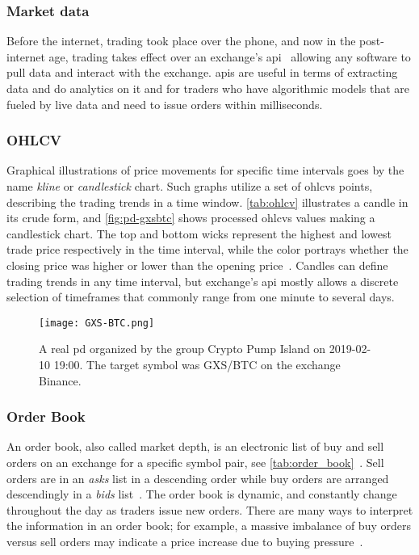 \subsubsection{Market data}
Before the internet, trading took place over the phone, and now in the post-internet age, trading takes effect over an exchange's \ac{api}~\cite{exchange_api} allowing any software to pull data and interact with the exchange. \Acp{api} are useful in terms of extracting data and do analytics on it and for traders who have algorithmic models that are fueled by live data and need to issue orders within milliseconds.

\subsubsection{OHLCV}
Graphical illustrations of price movements for specific time intervals goes by the name \emph{kline} or \emph{candlestick} chart. Such graphs utilize a set of \acp{ohlcv} points, describing the trading trends in a time window. \autoref{tab:ohlcv} illustrates a candle in its crude form, and \autoref{fig:pd-gxsbtc} shows processed \acp{ohlcv} values making a candlestick chart. The top and bottom wicks represent the highest and lowest trade price respectively in the time interval, while the color portrays whether the closing price was higher or lower than the opening price~\cite{P&D_to_the_moon}. Candles can define trading trends in any time interval, but exchange’s \ac{api} mostly allows a discrete selection of timeframes that commonly range from one minute to several days.


\begin{figure}[ht]
    \texttt{[image: GXS-BTC.png]}
    \centering
    \caption[\Acf{pd} observation]{A real \ac{pd} organized by the group Crypto Pump Island on 2019-02-10 19:00. The target symbol was GXS/BTC on the exchange Binance.}
    \label{fig:pd-gxsbtc}
\end{figure}

\subsubsection{Order Book}
An order book, also called market depth, is an electronic list of buy and sell orders on an exchange for a specific symbol pair, see \autoref{tab:order_book}~\cite{investopedia_depth}. Sell orders are in an \emph{asks} list in a descending order while buy orders are arranged descendingly in a \emph{bids} list~\cite{invest_order_book, coincodex_order_book}. The order book is dynamic, and constantly change throughout the day as traders issue new orders. There are many ways to interpret the information in an order book; for example, a massive imbalance of buy orders versus sell orders may indicate a price increase due to buying pressure~\cite{invest_order_book}.


